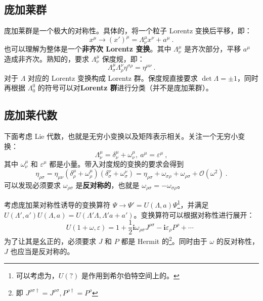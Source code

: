 
\begin{issues}
\issueMissDepend
\end{issues}

\subsection{庞加莱群}
庞加莱群是一个极大的对称性。具体的，将一个粒子 Lorentz 变换后平移，即：
\begin{equation}
	x^\mu \rightarrow (x')^\mu = \Lambda_{\nu}^\mu x^\nu + a^\mu ~.
\end{equation}
也可以理解为整体是一个\textbf{\textbf{非齐次 Lorentz 变换}}。其中 $\Lambda_{\nu}^\mu$ 是齐次部分，平移 $a^\mu$ 造成非齐次。熟知的，要求 $\Lambda_{\nu}^\mu$ 保度规，即：
\begin{equation}
	\Lambda_{\sigma}^\mu \Lambda_{\rho}^\nu \eta^{\sigma \rho} = \eta^{\mu \nu} ~.
\end{equation}
对于 $\Lambda$ 对应的 Lorentz 变换构成 Lorentz 群。保度规直接要求 $\det \Lambda = \pm 1$，同时再根据 $\Lambda^0_0$ 的符号可以对\textbf{\textbf{Lorentz 群}}进行分类（并不是庞加莱群）。

\subsection{庞加莱代数}
下面考虑 Lie 代数，也就是无穷小变换以及矩阵表示相关。关注一个无穷小变换：
\begin{equation}
	\Lambda_\nu^\mu = \delta_\nu^\mu + \omega_\nu^\mu , ~ a^\mu = \varepsilon^\mu ~,
\end{equation}
其中 $\omega^\mu_\nu$ 和 $\varepsilon^\mu$ 都是小量。带入对度规的变换的要求会得到
\begin{equation}
	\eta_{\rho\sigma} = \eta_{\mu\nu}(\delta^\mu_\rho + \omega^\mu_\rho) (\delta^\nu_\sigma + \omega^\nu_\sigma) = \eta_{\rho\sigma} + \omega_{\sigma\rho} + \omega_{\rho\sigma} + \mathcal O(\omega^2) ~.
\end{equation}
可以发现必须要求 $\omega_{\rho \sigma}$ 是\textbf{\textbf{反对称的}}，也就是 $\omega_{\rho \sigma} = -\omega_{\sigma \rho}$。

考虑庞加莱对称性诱导的变换算符 $\Psi \to \Psi' = U(\Lambda, a) \Psi$\footnote{可以考虑为，$U(?)$ 是作用到希尔伯特空间上的。}，并满足 $U(\Lambda', a') U(\Lambda, a) = U(\Lambda' \Lambda, \Lambda' a + a')$。变换算符可以根据对称性进行展开：
\begin{equation}
	U(1+\omega, \varepsilon) = 1 + \frac{1}{2} \mathbf{i} \omega_{\rho \sigma} J^{\rho \sigma} - \mathbf{i} \varepsilon_\rho P^\rho + \cdots ~~
\end{equation}
为了让其是幺正的，必须要求 $J$ 和 $P$ 都是 Hermit 的\footnote{即 $J^{\rho \sigma \dagger} = J^{\rho \sigma}, P^{\rho \dagger} = P^\rho$}。同时由于 $\omega$ 的反对称性，$J$ 也应当是反对称的。

